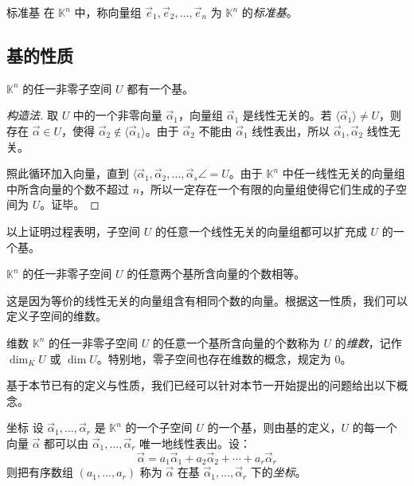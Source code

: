 \begin{definition}{标准基}
	在 $\mathbb K^n$ 中，称向量组 $\vec e_1, \vec e_2, \ldots, \vec e_n$ 为 $\mathbb K^n$ 的\emph{标准基}。
\end{definition}

\subsection{基的性质}

\begin{theorem}
	$\mathbb K^n$ 的任一非零子空间 $U$ 都有一个基。
\end{theorem}

\begin{proof}[构造法]
	取 $U$ 中的一个非零向量 $\vec \alpha_1$，向量组 $\vec \alpha_1$ 是线性无关的。若 $\langle \vec \alpha_1 \rangle \ne U$，则存在 $\vec \alpha \in U$，使得 $\vec \alpha_2 \not \in \langle \vec \alpha_1 \rangle$。由于 $\vec \alpha_2$ 不能由 $\vec \alpha_1$ 线性表出，所以 $\vec \alpha_1, \vec \alpha_2$ 线性无关。

	照此循环加入向量，直到 $\langle \vec \alpha_1, \vec \alpha_2, \ldots, \vec \alpha_s \angle = U$。由于 $\mathbb K^n$ 中任一线性无关的向量组中所含向量的个数不超过 $n$，所以一定存在一个有限的向量组使得它们生成的子空间为 $U$。证毕。
\end{proof}

以上证明过程表明，子空间 $U$ 的任意一个线性无关的向量组都可以扩充成 $U$ 的一个基。

\begin{theorem}
	$\mathbb K^n$ 的任一非零子空间 $U$ 的任意两个基所含向量的个数相等。
\end{theorem}

这是因为等价的线性无关的向量组含有相同个数的向量。根据这一性质，我们可以定义子空间的维数。

\begin{definition}{维数}
	$\mathbb K^n$ 的任一非零子空间 $U$ 的任意一个基所含向量的个数称为 $U$ 的\emph{维数}，记作 $\dim_K U$ 或 $\dim U$。特别地，零子空间也存在维数的概念，规定为 $0$。
\end{definition}

基于本节已有的定义与性质，我们已经可以针对本节一开始提出的问题给出以下概念。

\begin{definition}{坐标}
	设 $\vec \alpha_1, \ldots, \vec \alpha_r$ 是 $\mathbb K^n$ 的一个子空间 $U$ 的一个基，则由基的定义，$U$ 的每一个向量 $\vec \alpha$ 都可以由 $\vec \alpha_1, \ldots, \vec \alpha_r$ 唯一地线性表出。设：
	$$
	\vec \alpha = a_1 \vec \alpha_1 + a_2 \vec \alpha_2 + \cdots + a_r \vec \alpha_r
	$$
	则把有序数组 $(a_1, \ldots, a_r)$ 称为 $\vec \alpha$ 在基 $\vec \alpha_1, \ldots, \vec \alpha_r$ 下的\emph{坐标}。
\end{definition}

